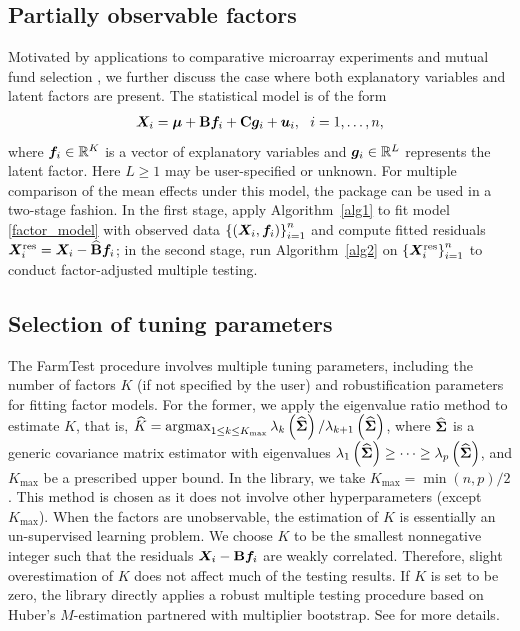 \subsection{Partially observable factors}\label{sec:mix_f}

Motivated by applications to comparative microarray experiments \citep{LS2008, FKC2009} and mutual fund selection \citep{LD2019}, we further discuss the case where both explanatory variables and latent factors are present. The statistical model is of the form
\begin{align}
	\bm{X}_i = \bm{\mu} + \mathbf{B} \bm f_i + \mathbf{C} \bm{g}_i +\bm{u}_i ,  \ \ i=1,\ldots, n ,  \nonumber
	\end{align}
where $\bm f_i \in \mathbb{R}^K$ is a vector of explanatory variables and $\bm{g}_i \in \mathbb{R}^L$ represents the latent factor.
Here $L\geq 1$ may be user-specified or unknown.
For multiple comparison of the mean effects under this model, the  package can be used in a two-stage fashion. In the first stage,  apply Algorithm~\ref{alg1} to fit model \eqref{factor_model} with observed data $\left\{\left( \bm{X}_i, \bm f_i\right)\right\}_{i=1}^n$ and compute fitted residuals $\bm{X}^{{\rm res}}_i = \bm{X}_i- \widehat{\mathbf{B}} \bm f_i$; in the second stage,  run Algorithm~\ref{alg2} on $\left\{\bm{X}^{{\rm res}}_i\right\}_{i=1}^n$ to conduct factor-adjusted multiple testing.

\subsection{Selection of tuning parameters}\label{sec:tuning}

The FarmTest procedure involves multiple tuning parameters, including the number of factors $K$ (if not specified by the user) and  robustification parameters for fitting factor models. For the former, we apply the eigenvalue ratio method \citep{LamYao,Ahn_Horen_2013} to estimate $K$, that is, $\widehat{K}=\mathop{\mathrm{argmax}}_{ 1\leq k \leq K_{\max}}  \lambda_k\left( \widehat {\bm{\Sigma}}\right)/ \lambda_{k+1}\left( \widehat {\bm{\Sigma}} \right)$, where $\widehat {\bm{\Sigma}}$ is a generic covariance matrix estimator with eigenvalues $\lambda_1\left(\widehat {\bm{\Sigma}}\right) \geq \cdots \geq \lambda_p\left(\widehat  {\bm{\Sigma}}\right)$, and $K_{\max}$ be a prescribed upper bound. In the library, we take $K_{\max} = \min\left(n,p\right)/2$.  This method is chosen as it does not involve other hyperparameters (except $K_{\max}$).
When the factors are unobservable, the estimation of $K$ is essentially an un-supervised learning problem. We choose $K$ to be the smallest nonnegative integer such that the residuals $\bm{X}_i-\mathbf{B}\bm f_i$ are weakly correlated. Therefore, slight overestimation of $K$ does not  affect much of the testing results. If $K$ is  set to be zero, the  library directly applies a robust multiple testing procedure based on Huber's $M$-estimation partnered with multiplier bootstrap. See \cite{ZBFL2017} for more details.



